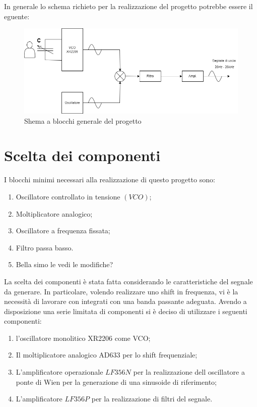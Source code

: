 \documentclass[titlepage]{report}
\begin{document}
	 In generale lo schema richieto per la realizzazione del progetto potrebbe essere il eguente:
	 
	\begin{figure}[htbp]
		\centering
		\includegraphics[scale=0.5]{Immagini/Schema Generale PSEA.png}
		\caption{Shema a blocchi generale del progetto}
		\label{fig: schema a blocchi generico}
	\end{figure}


\newpage

	
\chapter{Scelta dei componenti}
	\label{ch:Scelta_componenti}
	I blocchi minimi necessari alla realizzazione di questo progetto sono:
	
	\begin{enumerate}
		\item Oscillatore controllato in tensione $(VCO)$;
		\item Moltiplicatore analogico;
		\item Oscillatore a frequenza fissata;
		\item Filtro passa basso.
		\item Bella simo le vedi le modifiche?
	\end{enumerate}
	
	La scelta dei componenti è stata fatta considerando le caratteristiche del segnale da generare. In particolare, volendo realizzare uno shift in frequenza, vi è la necessità di lavorare con integrati con una banda passante adeguata.
	Avendo a disposizione una serie limitata di componenti si è deciso di utilizzare i seguenti componenti:
	
	\begin{enumerate}
		\item l'oscillatore monolitico XR2206 come VCO;
		\item Il moltiplicatore analogico AD633 per lo shift frequenziale;
		\item L'amplificatore operazionale $LF356N$ per la realizzazione dell oscillatore a ponte di Wien per la generazione di una sinusoide di riferimento;
		\item L'amplificatore $LF356P$ per la realizzazione di filtri del segnale.
	\end{enumerate}
	
\end{document}
